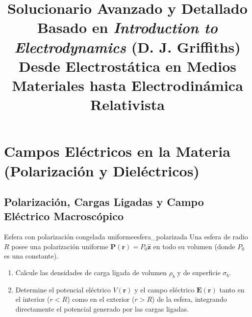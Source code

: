 \documentclass[11pt,a4paper]{book}
\title{\Huge \textbf{Solucionario Avanzado y Detallado}\\
\LARGE Basado en \textit{Introduction to Electrodynamics} (D. J. Griffiths)\\
\large Desde Electrostática en Medios Materiales hasta Electrodinámica Relativista}
\author{}
\date{}
\newcommand{\zhat}{\hat{\bm{z}}}
\newcommand{\Evec}{\bm{E}}
\newcommand{\Pvec}{\bm{P}}
\begin{document}
\maketitle
\begingroup
\let\cleardoublepage\clearpage
\tableofcontents
\endgroup
\newpage

\chapter[Campos eléctricos en la materia]{Campos Eléctricos en la Materia (Polarización y Dieléctricos)}

\section{Polarización, Cargas Ligadas y Campo Eléctrico Macroscópico}

\begin{ejercicio}{Esfera con polarización congelada uniforme}{esfera_polarizada}
Una esfera de radio $R$ posee una polarización uniforme $\Pvec(\bm{r}) = P_0 \zhat$ en todo su volumen (donde $P_0$ es una constante). 
\begin{enumerate}[label=\alph*)]
    \item Calcule las densidades de carga ligada de volumen $\rho_b$ y de superficie $\sigma_b$.
    \item Determine el potencial eléctrico $V(\bm{r})$ y el campo eléctrico $\Evec(\bm{r})$ tanto en el interior ($r < R$) como en el exterior ($r > R$) de la esfera, integrando directamente el potencial generado por las cargas ligadas.
\end{enumerate}
\end{ejercicio}
\end{document}
